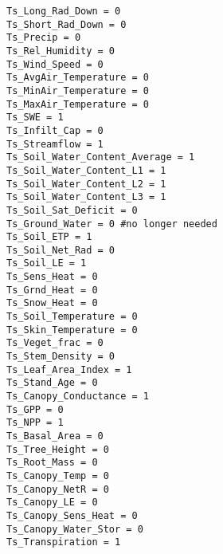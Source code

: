 \begin{verbatim}
Ts_Long_Rad_Down = 0
Ts_Short_Rad_Down = 0
Ts_Precip = 0
Ts_Rel_Humidity = 0
Ts_Wind_Speed = 0
Ts_AvgAir_Temperature = 0
Ts_MinAir_Temperature = 0
Ts_MaxAir_Temperature = 0
Ts_SWE = 1
Ts_Infilt_Cap = 0
Ts_Streamflow = 1
Ts_Soil_Water_Content_Average = 1
Ts_Soil_Water_Content_L1 = 1
Ts_Soil_Water_Content_L2 = 1
Ts_Soil_Water_Content_L3 = 1
Ts_Soil_Sat_Deficit = 0
Ts_Ground_Water = 0 #no longer needed
Ts_Soil_ETP = 1
Ts_Soil_Net_Rad = 0
Ts_Soil_LE = 1
Ts_Sens_Heat = 0
Ts_Grnd_Heat = 0
Ts_Snow_Heat = 0
Ts_Soil_Temperature = 0
Ts_Skin_Temperature = 0
Ts_Veget_frac = 0
Ts_Stem_Density = 0
Ts_Leaf_Area_Index = 1
Ts_Stand_Age = 0
Ts_Canopy_Conductance = 1
Ts_GPP = 0
Ts_NPP = 1
Ts_Basal_Area = 0
Ts_Tree_Height = 0
Ts_Root_Mass = 0
Ts_Canopy_Temp = 0
Ts_Canopy_NetR = 0
Ts_Canopy_LE = 0
Ts_Canopy_Sens_Heat = 0
Ts_Canopy_Water_Stor = 0
Ts_Transpiration = 1
\end{verbatim}